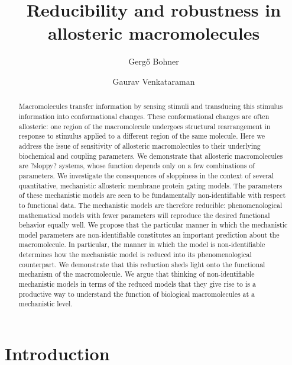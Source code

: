 \documentclass[10pt]{amsart}
\begin{document}
\title{Reducibility and robustness in allosteric macromolecules}

\author{Gerg\H{o} Bohner\and Gaurav Venkataraman}

\date{\vspace{-.1in}}

\begin{abstract}

Macromolecules transfer information by sensing stimuli and transducing this stimulus information into conformational changes.  These conformational changes are often allosteric: one region of the macromolecule undergoes structural rearrangement in response to stimulus applied to a different region of the same molecule.  Here we address the issue of sensitivity of allosteric macromolecules to their underlying biochemical and coupling parameters.  We demonstrate that allosteric macromolecules are ?sloppy? systems, whose function depends only on a few combinations of parameters. We investigate the consequences of sloppiness in the context of several quantitative, mechanistic allosteric membrane protein gating models.  The parameters of these mechanistic models are seen to be fundamentally non-identifiable with respect to functional data. The mechanistic models are therefore reducible: phenomenological mathematical models with fewer parameters will reproduce the desired functional behavior equally well.  We propose that the particular manner in which the mechanistic model parameters are non-identifiable constitutes an important prediction about the macromolecule.  In particular, the manner in which the model is non-identifiable determines how the mechanistic model is reduced into its phenomenological counterpart.  We demonstrate that this reduction sheds light onto the functional mechanism of the macromolecule.  We argue that thinking of non-identifiable mechanistic models in terms of the reduced models that they give rise to is a productive way to understand the function of biological macromolecules at a mechanistic level.

\end{abstract}

\maketitle

\section{Introduction}
\end{document}
